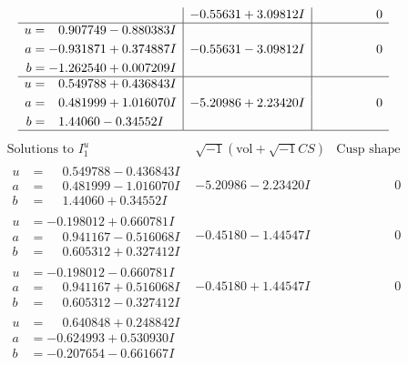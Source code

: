\documentclass[1p]{elsarticle_modified}
\theoremstyle{definition}
\newcommand{\I}{\sqrt{-1}}
\begin{document}
$$\begin{array}{c|c|c}
 & -0.55631 + 3.09812 I & \phantom{-0.000000 } 0 \\ \hline\begin{aligned}
u &= \phantom{-}0.907749 - 0.880383 I \\
a &= -0.931871 + 0.374887 I \\
b &= -1.262540 + 0.007209 I\end{aligned}
 & -0.55631 - 3.09812 I & \phantom{-0.000000 } 0 \\ \hline\begin{aligned}
u &= \phantom{-}0.549788 + 0.436843 I \\
a &= \phantom{-}0.481999 + 1.016070 I \\
b &= \phantom{-}1.44060 - 0.34552 I\end{aligned}
 & -5.20986 + 2.23420 I & \phantom{-0.000000 } 0\\
 \hline 
 \end{array}$$\newpage$$\begin{array}{c|c|c}  
\text{Solutions to }I^u_{1}& \I (\text{vol} + \sqrt{-1}CS) & \text{Cusp shape}\\
 \hline 
\begin{aligned}
u &= \phantom{-}0.549788 - 0.436843 I \\
a &= \phantom{-}0.481999 - 1.016070 I \\
b &= \phantom{-}1.44060 + 0.34552 I\end{aligned}
 & -5.20986 - 2.23420 I & \phantom{-0.000000 } 0 \\ \hline\begin{aligned}
u &= -0.198012 + 0.660781 I \\
a &= \phantom{-}0.941167 - 0.516068 I \\
b &= \phantom{-}0.605312 + 0.327412 I\end{aligned}
 & -0.45180 - 1.44547 I & \phantom{-0.000000 } 0 \\ \hline\begin{aligned}
u &= -0.198012 - 0.660781 I \\
a &= \phantom{-}0.941167 + 0.516068 I \\
b &= \phantom{-}0.605312 - 0.327412 I\end{aligned}
 & -0.45180 + 1.44547 I & \phantom{-0.000000 } 0 \\ \hline\begin{aligned}
u &= \phantom{-}0.640848 + 0.248842 I \\
a &= -0.624993 + 0.530930 I \\
b &= -0.207654 - 0.661667 I\end{aligned}

\end{array}$$
\end{document}
